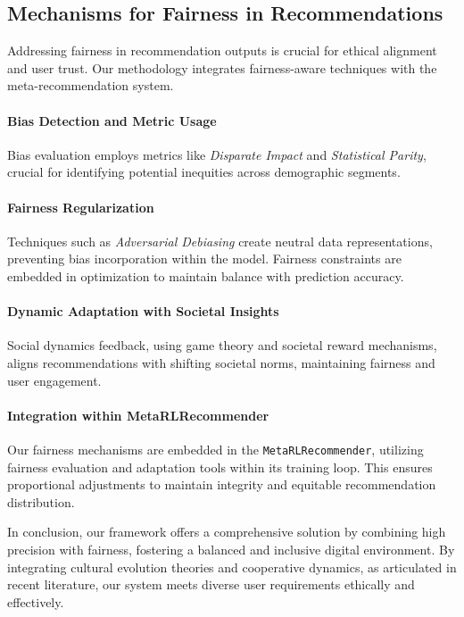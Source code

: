 \documentclass{article} %
\begin{document}
\subsection{Mechanisms for Fairness in Recommendations}

Addressing fairness in recommendation outputs is crucial for ethical alignment and user trust. Our methodology integrates fairness-aware techniques with the meta-recommendation system.

\paragraph{Bias Detection and Metric Usage}
Bias evaluation employs metrics like \emph{Disparate Impact} and \emph{Statistical Parity}, crucial for identifying potential inequities across demographic segments.

\paragraph{Fairness Regularization}
Techniques such as \emph{Adversarial Debiasing} create neutral data representations, preventing bias incorporation within the model. Fairness constraints are embedded in optimization to maintain balance with prediction accuracy.

\paragraph{Dynamic Adaptation with Societal Insights}
Social dynamics feedback, using game theory and societal reward mechanisms, aligns recommendations with shifting societal norms, maintaining fairness and user engagement.

\paragraph{Integration within MetaRLRecommender}
Our fairness mechanisms are embedded in the \texttt{MetaRLRecommender}, utilizing fairness evaluation and adaptation tools within its training loop. This ensures proportional adjustments to maintain integrity and equitable recommendation distribution.

In conclusion, our framework offers a comprehensive solution by combining high precision with fairness, fostering a balanced and inclusive digital environment. By integrating cultural evolution theories and cooperative dynamics, as articulated in recent literature, our system meets diverse user requirements ethically and effectively.
\end{document}
